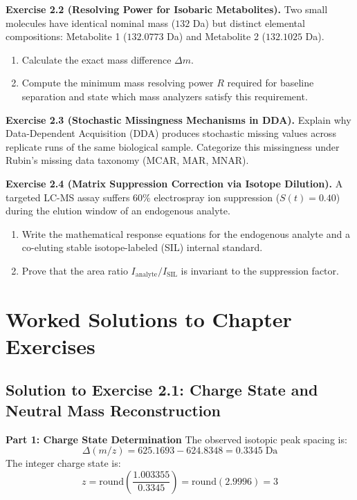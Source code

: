 \documentclass[11pt,twoside,openright]{book}
\begin{document}
\vspace{0.8em}
\noindent\textbf{Exercise 2.2 (Resolving Power for Isobaric Metabolites).}\enspace
\label{ex:resolving_power_isobars}
Two small molecules have identical nominal mass ($132$ Da) but distinct elemental compositions: Metabolite 1 ($132.0773$ Da) and Metabolite 2 ($132.1025$ Da).
\begin{enumerate}
    \item Calculate the exact mass difference $\Delta m$.
    \item Compute the minimum mass resolving power $R$ required for baseline separation and state which mass analyzers satisfy this requirement.
\end{enumerate}

\vspace{0.8em}
\noindent\textbf{Exercise 2.3 (Stochastic Missingness Mechanisms in DDA).}\enspace
\label{ex:dda_stochastic_missingness}
Explain why Data-Dependent Acquisition (DDA) produces stochastic missing values across replicate runs of the same biological sample. Categorize this missingness under Rubin's missing data taxonomy (MCAR, MAR, MNAR).

\vspace{0.8em}
\noindent\textbf{Exercise 2.4 (Matrix Suppression Correction via Isotope Dilution).}\enspace
\label{ex:sil_matrix_correction}
A targeted LC-MS assay suffers $60\%$ electrospray ion suppression ($S(t) = 0.40$) during the elution window of an endogenous analyte.
\begin{enumerate}
    \item Write the mathematical response equations for the endogenous analyte and a co-eluting stable isotope-labeled (SIL) internal standard.
    \item Prove that the area ratio $I_{\text{analyte}} / I_{\text{SIL}}$ is invariant to the suppression factor.
\end{enumerate}

\FloatBarrier

\section{Worked Solutions to Chapter Exercises}
\label{sec:solutions}

\subsection{Solution to Exercise 2.1: Charge State and Neutral Mass Reconstruction}
\noindent\textbf{Part 1: Charge State Determination}\enspace
The observed isotopic peak spacing is:
\begin{equation}
\Delta(m/z) = 625.1693 - 624.8348 = 0.3345\;\text{Da}
\end{equation}
The integer charge state is:
\begin{equation}
z = \text{round}\left( \frac{1.003355}{0.3345} \right) = \text{round}(2.9996) = 3
\end{equation}
\end{document}
